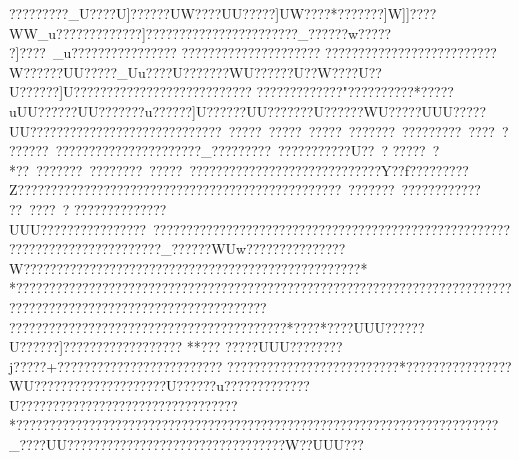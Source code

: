{{{{{{{{{{{{{{{{{{{{{{{{{{{{{{{{{{{{{{{{{{{{{{{{{{{{{{{{{{{{{{{{{{{{{{{{{{{{{{{{{{{{{{{{{{{{{{{{{{{{{{{{{{{{{{{{{{{{{{{{{{{{{{{{{{{{{{{{{{{{{{{{{{{{{{{{{{{{{{{{{{{{{{{{{{{{{{{{{{{{{{{{{{{{{{{{{{{{{{{{{{{{{{{{{{{{{{{{{{{{{{{{{{{{{{{{{{{{{{{{{{{{{{{{{{{{{{{{{{{{{{{{{{{{{{{{{{{{{{{{{{{{{{{{{{{{{{{{{{{{{{{{{{{{{{{{{{{{{{{{{{{{{{{{{{{{{{{{{{{{{{{{{{{{{{{{{{{{{{{{{{{{{{{{{{{{{{{{{{{{{{{{{{{{{{{{{{{{{{{{{{{{{{{{{{{{{{{{{{{{{{{{{{{{{{{{{{{{{{{{{{{{{{{{{{{{{{{{{{{{{{{{{{{{{{{{{{{{{{{{{{{{{{{{{{{{{{{{{{{{{{{{{{{{{{{{{{{{{{{{{{{{{{{{{{{{{{{{{{{{{{{{{{{{{{{{{{{{{{{{{{{{{{{{{{{{{{{{{{{{{{{{{{{{{{{{{{{{{{{{{{{{{{{{{{{{{{{{{{{{{{{{{{{{{{{{{{{{{{{{{{{{{{{{{{{{{{{{{{{{{{{{{{{{{{{{{{{{{{{{{{{{{{{{{{{{{{{{{{{{{{{{{{{{{{{{{{{{{{{{{{{{{{{{{{{{{{{{{{{{{{{{{{{{{{{{{{{{{{{{{{{{{{{{{{{{{{{{{{{{{{{{{{{{{{{{{{{{{{{{{{{{{{{{{{{{{{{{{{{{{{{{{{{{{{{{{{{{{{{{{{{{{{{{{{{{{{{{{{{{{{{{{{{{{{{{{{{{{{{{{{{{{{{{{{{{{{{{{{{{{{{{{{{{{{{{{{{{{{{{{{{{{{{{{{{{{{{{{{{{{{{{{{{{{{{{{{{{{{{{{{{{{{{{{{{{{{{{{{{{{{{{{{{{{{{{{{{{{{{{{{{{{{{{{{{{{{{{{{{{{{{{{{{{{{{{{{{{{{{{{{{{{{{{{{{{{{{{{{{{{{{{{{{{{{{{{{{{{{{{{{{{{{{{{{{{{{{{{{{{{{{{{{{{{{{{{{{{{{{{{{{{{{{{{{{{{{{{{{{{{{{{{{{{{{{{{{{{{{{{{{{{{{{{{{{{{{{{{{{{{{{{{{{{{{{{{{{{{{{{{{{{{{{{{{{{{{{{{{{{{{{{{{{{{{{{{{{{{{{{{{{{{{{{{{{{{{{{{{{{{{{{{{{{{{{{{{{{{{{{{{{{{{{{{{{{{{{{{{{{{{{{{{{{{{{{{{{{{{{{{{{{{{{{{{{{{{{{{{{{{{{{{{{{{{{{{{{{{{{{{{{{{{{{{{{{{{{{{{{{{{{{{{{{{{{{{{{{{{{{{{{{{{{{{{{{{{{{{{{{{{{{{{{{{{{{{{{{{{{{{{{{{{{{{{{{{{{{{{{{{{{{{{{{{{{{{{{{{{{{{{{{{{{{{{{{{{{{{{{{{{{{{{{{{{{{{{{{{{{{{{{{{{{{{{{{{{{{{{{{{{{{{{{{{{{{{{{{{{{{{{{{{{{{{{{{{{{{{{{{{{{{{{{{{{{{{{{{{{{{{{{{{{{{{{{{{{{{{{{{{{{{{{{{{{{{{{{{{{{{{{{{{{{{{{{{{{{{{{{{{{{{{{{{{{{{{{{{{{{{{{{{{{{{{{{{{{{{{{{{{{{{{{{{{{{{{{{{{{{{{{{{{{{{{{{{{{{{{{{{{{{{{{{{{{{{{{{{{{{{?????????_U????U]}}??????UW????UU?????]UW????*???????]W]]????WW_u?????????????]???????????????????????_??????w??????]????~_u?????  ??????? ????    ????   ?????  ??????  ?????? ??????????????????????????W??????UU?????_Uu????U???????WU??????U??W????U??U??????]U???????????????????????????
???????  ??????  "?????   ?????   *?????uUU??????UU???????u??????]U??????UU???????U??????WU?????UUU?????UU????  ??????  ?????? ?????????????~?????~?????~?????~???????~?????????~????~???????~??????????????????????_?????????~?????????}??U??~?
?????~?
*??~???????~????????~?????~?????????????????    ????????????Y??f????    ?????Z?????????????????????????????????????????????????~???????~??????????????~?   ???~? 
??????????????UUU????????????????~??????????????????????????????????????????????????????????????????????}???????_??????WUw???????????????W???????????????????????????????????????????????????*
*?????????????????????????????????????????????????????????????????????????????????????????????????????????????????????????}??????????????????????????????????? *????   *????UUU??????U??????]??????????????????
**???  
??    ???UUU????????j?????  +?????????????????????????
??????  ????????????????????*????????????????WU????????????????????U??????u?????????????U?????? ???????????????????????????*?????????????????????????????????????????????????????????????????????????_????UU???  ????   ???   ??? ????????????????????W??UUU??? }}}}}}}}}}}}}}}}}}}}}}}}}}}}}}}}}}}}}}}}}}}}}}}}}}}}}}}}}}}}}}}}}}}}}}}}}}}}}}}}}}}}}}}}}}}}}}}}}}}}}}}}}}}}}}}}}}}}}}}}}}}}}}}}}}}}}}}}}}}}}}}}}}}}}}}}}}}}}}}}}}}}}}}}}}}}}}}}}}}}}}}}}}}}}}}}}}}}}}}}}}}}}}}}}}}}}}}}}}}}}}}}}}}}}}}}}}}}}}}}}}}}}}}}}}}}}}}}}}}}}}}}}}}}}}}}}}}}}}}}}}}}}}}}}}}}}}}}}}}}}}}}}}}}}}}}}}}}}}}}}}}}}}}}}}}}}}}}}}}}}}}}}}}}}}}}}}}}}}}}}}}}}}}}}}}}}}}}}}}}}}}}}}}}}}}}}}}}}}}}}}}}}}}}}}}}}}}}}}}}}}}}}}}}}}}}}}}}}}}}}}}}}}}}}}}}}}}}}}}}}}}}}}}}}}}}}}}}}}}}}}}}}}}}}}}}}}}}}}}}}}}}}}}}}}}}}}}}}}}}}}}}}}}}}}}}}}}}}}}}}}}}}}}}}}}}}}}}}}}}}}}}}}}}}}}}}}}}}}}}}}}}}}}}}}}}}}}}}}}}}}}}}}}}}}}}}}}}}}}}}}}}}}}}}}}}}}}}}}}}}}}}}}}}}}}}}}}}}}}}}}}}}}}}}}}}}}}}}}}}}}}}}}}}}}}}}}}}}}}}}}}}}}}}}}}}}}}}}}}}}}}}}}}}}}}}}}}}}}}}}}}}}}}}}}}}}}}}}}}}}}}}}}}}}}}}}}}}}}}}}}}}}}}}}}}}}}}}}}}}}}}}}}}}}}}}}}}}}}}}}}}}}}}}}}}}}}}}}}}}}}}}}}}}}}}}}}}}}}}}}}}}}}}}}}}}}}}}}}}}}}}}}}}}}}}}}}}}}}}}}}}}}}}}}}}}}}}}}}}}}}}}}}}}}}}}}}}}}}}}}}}}}}}}}}}}}}}}}}}}}}}}}}}}}}}}}}}}}}}}}}}}}}}}}}}}}}}}}}}}}}}}}}}}}}}}}}}}}}}}}}}}}}}}}}}}}}}}}}}}}}}}}}}}}}}}}}}}}}}}}}}}}}}}}}}}}}}}}}}}}}}}}}}}}}}}}}}}}}}}}}}}}}}}}}}}}}}}}}}}}}}}}}}}}}}}}}}}}}}}}}}}}}}}}}}}}}}}}}}}}}}}}}}}}}}}}}}}}}}}}}}}}}}}}}}}}}}}}}}}}}}}}}}}}}}}}}}}}}}}}}}}}}}}}}}}}}}}}}}}}}}}}}}}}}}}}}}}}}}}}}}}}}}}}}}}}}}}}}}}}}}}}}}}}}}}}}}}}}}}}}}}}}}}}}}}}}}}}}}}}}}}}}}}}}}}}}}}}}}}}}}}}}}}}}}}}}}}}}}}}}}}}}}}}}}}}}}}}}}}}}}}}}}}}}}}}}}}}}}}}}}}}}}}}}}}}}}}}}}}}}}}}}}}}}}}}}}}}}}}}}}}}}}}}}}}}}}}}}}}}}}}}}}}}}}}}}}}}}}}}}}}}}}}}}}}}}}}}}}}}}}}}}}}}}}}}}}}}}}}}}}}}}}}}}}}}}}}}}}}}}}}}}}}}}}}}}}}}}}}}}}}}}}}}}}}}}}}}}}}}}}}}}}}}}}}}}}}}}}}}}}}}}}}}}}}}}}}}}}}}}}}}}}}}}}}}}}}}}}}}}}}}}}}}}}}}}}}}}}}}}}}}}}}}}}}}}}}}}}}}}}}}}}}}}}}}}}}}}}}}}}}}}}}}}}}}}}}}}}}}}}}}}}}}}}}}}}}}}}}}}}}}}}}}}}}}}}

